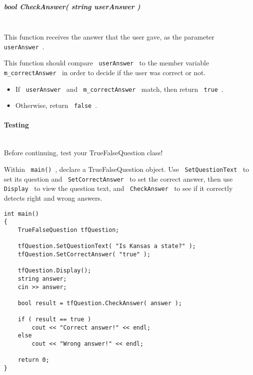 \documentclass[a4paper,12pt]{book}
\begin{document}
                        \subparagraph{ bool CheckAnswer( string userAnswer ) } ~\\

                            This function receives the answer that the user gave,
                            as the parameter \texttt{ userAnswer }.

                            This function should compare \texttt{ userAnswer } to
                            the member variable \texttt{ m\_correctAnswer } in order
                            to decide if the user was correct or not.

                            \begin{itemize}
                                \item If \texttt{ userAnswer } and \texttt{ m\_correctAnswer } match, then return \texttt{ true }.
                                \item Otherwise, return \texttt{ false }.
                            \end{itemize}
                        
                    \paragraph{ Testing } ~\\
                        Before continuing, test your TrueFalseQuestion class!

                        Within \texttt{ main() }, declare a TrueFalseQuestion object.
                        Use \texttt{ SetQuestionText } to set its question and
                        \texttt{ SetCorrectAnswer } to set the correct answer,
                        then use \texttt{ Display } to view the question text,
                        and \texttt{ CheckAnswer } to see if it correctly detects
                        right and wrong answers. \newpage

\begin{lstlisting}[style=code]
int main()
{
    TrueFalseQuestion tfQuestion;

    tfQuestion.SetQuestionText( "Is Kansas a state?" );
    tfQuestion.SetCorrectAnswer( "true" );

    tfQuestion.Display();
    string answer;
    cin >> answer;

    bool result = tfQuestion.CheckAnswer( answer );

    if ( result == true )
        cout << "Correct answer!" << endl;
    else
        cout << "Wrong answer!" << endl;

    return 0;
}
\end{lstlisting}
\end{document}
